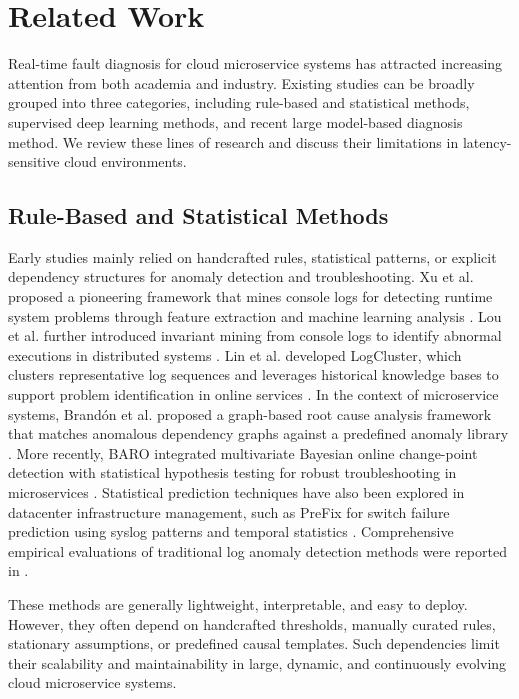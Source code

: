 \section{Related Work}

Real-time fault diagnosis for cloud microservice systems has attracted increasing attention from both academia and industry. Existing studies can be broadly grouped into three categories, including rule-based and statistical methods, supervised deep learning methods, and recent large model-based diagnosis method. We review these lines of research and discuss their limitations in latency-sensitive cloud environments.

\subsection{Rule-Based and Statistical Methods}

Early studies mainly relied on handcrafted rules, statistical patterns, or explicit dependency structures for anomaly detection and troubleshooting. Xu et al. proposed a pioneering framework that mines console logs for detecting runtime system problems through feature extraction and machine learning analysis \cite{xu2009detecting}. Lou et al. further introduced invariant mining from console logs to identify abnormal executions in distributed systems \cite{lou2010mining}. Lin et al. developed LogCluster, which clusters representative log sequences and leverages historical knowledge bases to support problem identification in online services \cite{lin2016log}. In the context of microservice systems, Brandón et al. proposed a graph-based root cause analysis framework that matches anomalous dependency graphs against a predefined anomaly library \cite{brandon2020graph}. More recently, BARO integrated multivariate Bayesian online change-point detection with statistical hypothesis testing for robust troubleshooting in microservices \cite{pham2024baro}. Statistical prediction techniques have also been explored in datacenter infrastructure management, such as PreFix for switch failure prediction using syslog patterns and temporal statistics \cite{zhang2018prefix}. Comprehensive empirical evaluations of traditional log anomaly detection methods were reported in \cite{he2016experience}.

These methods are generally lightweight, interpretable, and easy to deploy. However, they often depend on handcrafted thresholds, manually curated rules, stationary assumptions, or predefined causal templates. Such dependencies limit their scalability and maintainability in large, dynamic, and continuously evolving cloud microservice systems.

